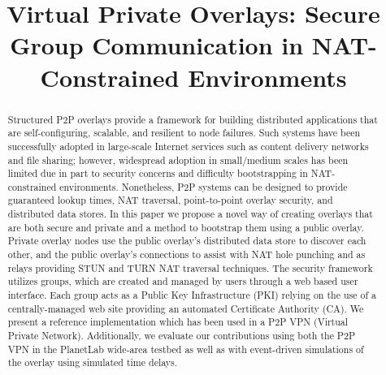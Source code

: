 \documentclass[conference]{IEEEtran}
\begin{document}
\title{Virtual Private Overlays: Secure Group Communication in NAT-Constrained Environments}

\author{ 
}

\maketitle

\begin{abstract}
Structured P2P overlays provide a framework for building distributed applications that
are self-configuring, scalable, and resilient to node failures.  Such systems
have been successfully adopted in large-scale Internet services such as content
delivery networks and file sharing; however, widespread adoption in small/medium
scales has been limited due in part to security concerns and difficulty
bootstrapping in NAT-constrained environments.  Nonetheless, P2P systems can be designed to
provide guaranteed lookup times, NAT traversal, point-to-point overlay
security, and distributed data stores. In this paper we propose
a novel way of creating overlays that are both secure and
private and a method to bootstrap them using a public overlay.
Private overlay nodes use the public overlay's distributed data store to discover
each other, and the public overlay's connections to assist with NAT hole punching
and as relays providing STUN and TURN NAT traversal techniques.  The security
framework utilizes groups, which are created and managed by users through
a web based user interface.
Each group acts as a Public Key Infrastructure (PKI) relying on
the use of a centrally-managed web site providing an automated Certificate
Authority (CA).  We present a reference implementation which has been used in
a P2P VPN (Virtual Private Network).  Additionally, we evaluate our contributions using
both the P2P VPN in the PlanetLab wide-area testbed as well as with event-driven
simulations of the overlay using simulated time delays.
\end{abstract}
\end{document}
